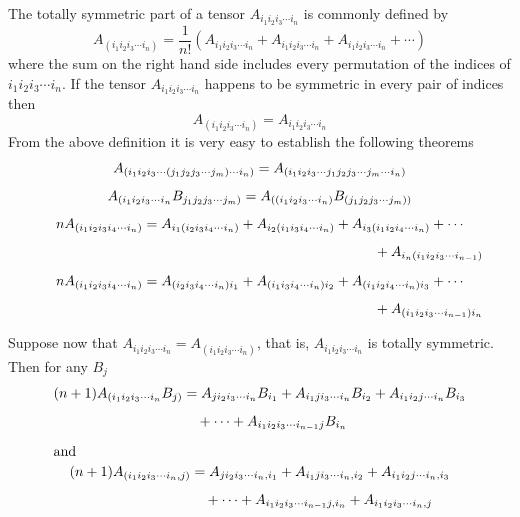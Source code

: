 \documentclass[a4paper,12pt]{article}
\numberwithin{equation}{section}
\begin{document}
The totally symmetric part of a tensor $A_{i_1i_2i_3\cdots i_n}$ is commonly
defined by
\[
A_{\left(i_1i_2i_3\cdots i_n\right)}
= \frac{1}{n!}\left(  A_{i_1i_2i_3\cdots i_n}
                    + A_{i_1i_2i_3\cdots i_n}
                    + A_{i_1i_2i_3\cdots i_n}
                    + \cdots \right)
\]
where the sum on the right hand side includes every permutation of the indices
of $i_1i_2i_3\cdots i_n$. If the tensor $A_{i_1i_2i_3\cdots i_n}$ happens to be
symmetric in every pair of indices then
\[
A_{\left(i_1i_2i_3\cdots i_n\right)} = A_{i_1i_2i_3\cdots i_n}
\]
From the above definition it is very easy to establish the following theorems
\begin{gather*}
A_{(i_1i_2i_3\cdots(j_1j_2j_3\cdots j_m)\cdots i_n)}
= A_{(i_1i_2i_3\cdots j_1j_2j_3\cdots j_m\cdots i_n)}\\[5pt]
A_{(i_1i_2i_3\cdots i_n}B_{j_1j_2j_3\cdots j_m)}
= A_{((i_1i_2i_3\cdots i_n)}B_{(j_1j_2j_3\cdots j_m))}\\[5pt]
nA_{(i_1i_2i_3i_4\cdots i_n)} = A_{i_1(i_2i_3i_4\cdots i_n)}
                        + A_{i_2(i_1i_3i_4\cdots i_n)}
                        + A_{i_3(i_1i_2i_4\cdots i_n)}
                        + \cdots\notag\\[5pt]
                        {\hskip 0.7\textwidth} + A_{i_n(i_1i_2i_3\cdots i_{n-1})}\\[5pt]
nA_{(i_1i_2i_3i_4\cdots i_n)} = A_{(i_2i_3i_4\cdots i_n)i_1}
                        + A_{(i_1i_3i_4\cdots i_n)i_2}
                        + A_{(i_1i_2i_4\cdots i_n)i_3}
                        + \cdots\notag\\[5pt]
                        {\hskip 0.7\textwidth} + A_{(i_1i_2i_3\cdots i_{n-1})i_n}
\end{gather*}

Suppose now that $A_{i_1i_2i_3\cdots i_n} = A_{(i_1i_2i_3\cdots i_n)}$, that is,
$A_{i_1i_2i_3\cdots i_n}$ is totally symmetric. Then for any $B_j$
\begin{gather*}
\begin{split}
(n+1) A_{(i_1i_2i_3\cdots i_n}B_{j)}
&= A_{ji_2i_3\cdots i_n} B_{i_1}
+ A_{i_1ji_3\cdots i_n} B_{i_2}
+ A_{i_1i_2j\cdots i_n} B_{i_3}\\[5pt]
&\quad+ \cdots + A_{i_1i_2i_3\cdots i_{n-1}j} B_{i_n}
\end{split}\\[5pt]
\intertext{and}
\begin{split}
(n+1) A_{(i_1i_2i_3\cdots i_n,j)}
&= A_{ji_2i_3\cdots i_n,i_1}
+ A_{i_1ji_3\cdots i_n,i_2}
+ A_{i_1i_2j\cdots i_n,i_3}\\[5pt]
&\quad+\cdots
+A_{i_1i_2i_3\cdots i_{n-1}j,i_n}
+A_{i_1i_2i_3\cdots i_n,j}
\end{split}
\end{gather*}
\end{document}
